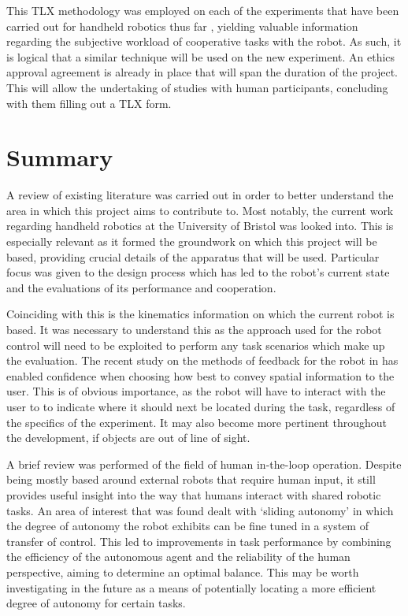 \documentclass[11pt]{article}
\begin{document}
This TLX methodology was employed on each of the experiments that have been carried out for handheld robotics thus far \cite{GreggSmithDesign} \cite{GreggSmithFeedback}, yielding valuable information regarding the subjective workload of cooperative tasks with the robot. As such, it is logical that a similar technique will be used on the new experiment. An ethics approval agreement is already in place that will span the duration of the project. This will allow the undertaking of studies with human participants, concluding with them filling out a TLX form. 
\pagebreak




\section{Summary}
A review of existing literature was carried out in order to better understand the area in which this project aims to contribute to. Most notably, the current work regarding handheld robotics at the University of Bristol was looked into. This is especially relevant as it formed the groundwork on which this project will be based,  providing crucial details of the apparatus that will be used. Particular focus was given to the design process which has led to the robot's current state and the evaluations of its performance and cooperation. 

Coinciding with this is the kinematics information on which the current robot is based. It was necessary to understand this as the approach used for the robot control will need to be exploited to perform any task scenarios which make up the evaluation. The recent study on the methods of feedback for the robot in \cite{GreggSmithFeedback} has enabled confidence when choosing how best to convey spatial information to the user. This is of obvious importance, as the robot will have to interact with the user to to indicate where it should next be located during the task, regardless of the specifics of the experiment. It may also become more pertinent throughout the development, if objects are out of line of sight.

A brief review was performed of the field of human in-the-loop operation. Despite being mostly based around external robots that require human input, it still provides useful insight into the way that humans interact with shared robotic tasks. An area of interest that was found dealt with `sliding autonomy' in which the degree of autonomy the robot exhibits can be fine tuned in a system of transfer of control. This led to improvements in task performance by combining the efficiency of the autonomous agent and the reliability of the human perspective, aiming to determine an optimal balance. This may be worth investigating in the future as a means of potentially locating a more efficient degree of autonomy for certain tasks. 
\end{document}
